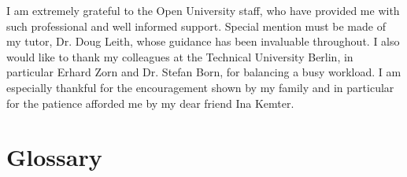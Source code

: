 \documentclass[
11pt, %
english, %
singlespacing, %
headsepline, %
oneside,
]{MastersDoctoralThesis} %
\begin{document}

\begin{acknowledgements}
\addchaptertocentry{\acknowledgementname} %
I am extremely grateful to the Open University staff, who have provided me with such professional and well informed support. Special mention must be made of my tutor, Dr. Doug Leith, whose guidance has been invaluable throughout. I also would like to thank my colleagues at the Technical University Berlin, in particular Erhard Zorn and Dr. Stefan Born, for balancing a busy workload. I am especially thankful for the encouragement shown by my family and in particular for the patience afforded me by my dear friend Ina Kemter.
\end{acknowledgements}


\tableofcontents %



\chapter{Glossary}
\end{document}
